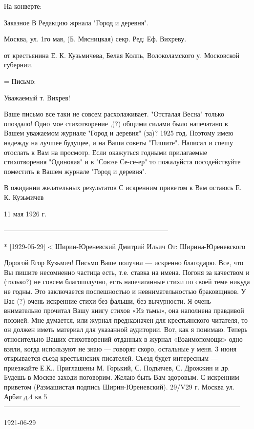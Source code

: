 \documentclass[]{memoir}
\begin{document}
На конверте:

Заказное
В Редакцию жрнала "Город и деревня".

Москва, ул. 1го мая,
(Б. Мясницкая)
секр. Ред: Еф. Вихреву.

от крестьянина Е. К. Кузьмичева,
Белая Колпь, Волоколамского у.
Московской губернии.


= Письмо:

Уважаемый т. Вихрев!

Ваше письмо все таки не совсем расхолаживает. "Отсталая Весна" только опоздало! Одно мое стихотворение ,(?) общими силами было напечатано в Вашем уважаемом журнале "Город и деревня" (за)? 1925 год. Поэтому имею надежду на лучшее будущее, и на Ваши советы "Пишите". Написал и спешу отослать к Вам на просмотр. Если окажуться годными прилагаемые стихотворения "Одинокая" и в "Союзе Се-се-ер" то пожалуйста посодействуйте поместить в Вашем журнале "Город и деревня".

В ожидании желательных результатов
С искренним приветом к Вам остаюсь
Е. К. Кузьмичев

11 мая 1926 г.

------------------------------------------------------------------------

* [1929-05-29] < Ширин-Юреневский Дмитрий Ильич
От: Ширина-Юреневского

Дорогой Егор Кузьмич!
Письмо Ваше получил — искренно благодарю.
Все, что Вы пишите несомненно частица есть, т.е. ставка на имена.  Погоня за качеством и (только?) не совсем благополучно, есть напечатанные стихи по своей теме никуда не годны. Это заключается поспешностью и невнимательностью браковщиков. У Вас (?) очень искренние стихи без фальши, без вычурности. Я очень внимательно прочитал Вашу книгу стихов «Из тьмы», она наполнена правдивой поэзией. Мне думается, или журнал предназначен для крестьянского читателя, то он должен иметь материал для указанной аудитории. Вот, как я понимаю. Теперь относительно Ваших стихотворений отданных в журнал «Взаимопомощи» одно взяли, когда используют не знаю — говорят скоро, остальные у меня. 3 июня открывается съезд крестьянских писателей. Съезд будет интересным — приезжайте Е.К.. Приглашены М. Горький, С. Подъячев, С. Дрожжин и др. Будешь в Москве заходи поговорим. Желаю быть Вам здоровым.
С искренним приветом (Размашистая подпись Ширин-Юреневский).
29/V29 г.
Москва ул. Арбат д.4 кв 5
--------------------------------------------------------------------------------------------------------

1921-06-29
\end{document}
